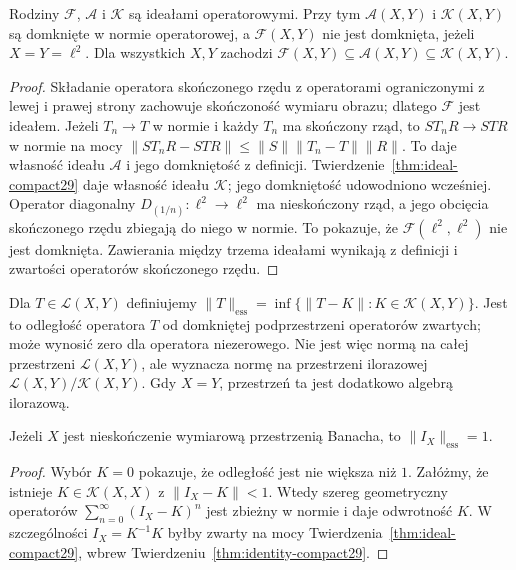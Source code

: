 \begin{twierdzenie}
\label{thm:ideals29}
Rodziny $\mathcal F$, $\mathcal A$ i $\mathcal K$ są
ideałami operatorowymi. Przy tym $\mathcal A(X,Y)$
i $\mathcal K(X,Y)$ są domknięte w normie operatorowej,
a $\mathcal F(X,Y)$ nie jest domknięta, jeżeli
$X=Y=\ell^2$. Dla wszystkich $X,Y$ zachodzi
$\mathcal F(X,Y)\subseteq\mathcal A(X,Y)\subseteq
\mathcal K(X,Y)$.
\end{twierdzenie}
\begin{proof}
Składanie operatora skończonego rzędu z operatorami
ograniczonymi z lewej i prawej strony zachowuje
skończoność wymiaru obrazu; dlatego $\mathcal F$ jest ideałem.
Jeżeli $T_n\to T$ w normie i każdy $T_n$ ma skończony
rząd, to $ST_nR\to STR$ w normie na mocy
$\|ST_nR-STR\|\le\|S\|\|T_n-T\|\|R\|$.
To daje własność ideału $\mathcal A$ i jego domkniętość
z definicji. Twierdzenie~\ref{thm:ideal-compact29}
daje własność ideału $\mathcal K$; jego domkniętość
udowodniono wcześniej. Operator diagonalny
$D_{(1/n)}:\ell^2\to\ell^2$ ma nieskończony rząd,
a jego obcięcia skończonego rzędu zbiegają do niego
w normie. To pokazuje, że $\mathcal F(\ell^2,\ell^2)$
nie jest domknięta. Zawierania między trzema ideałami
wynikają z definicji i zwartości operatorów
skończonego rzędu.
\end{proof}

\begin{definicja}
\label{def:essential-norm29}
Dla $T\in\mathcal L(X,Y)$ definiujemy
$\|T\|_{\mathrm{ess}}=
\inf\{\|T-K\|:K\in\mathcal K(X,Y)\}$.
Jest to odległość operatora $T$ od domkniętej
podprzestrzeni operatorów zwartych; może wynosić zero
dla operatora niezerowego. Nie jest więc normą
na całej przestrzeni $\mathcal L(X,Y)$, ale wyznacza normę
na przestrzeni ilorazowej
$\mathcal L(X,Y)/\mathcal K(X,Y)$. Gdy $X=Y$,
przestrzeń ta jest dodatkowo algebrą ilorazową.
\end{definicja}

\begin{twierdzenie}
\label{thm:essential-identity29}
Jeżeli $X$ jest nieskończenie wymiarową przestrzenią
Banacha, to $\|I_X\|_{\mathrm{ess}}=1$.
\end{twierdzenie}
\begin{proof}
Wybór $K=0$ pokazuje, że odległość jest nie większa
niż $1$. Załóżmy, że istnieje $K\in\mathcal K(X,X)$
z $\|I_X-K\|<1$. Wtedy szereg geometryczny operatorów
$\sum_{n=0}^{\infty}(I_X-K)^n$ jest zbieżny w normie
i daje odwrotność $K$. W szczególności
$I_X=K^{-1}K$ byłby zwarty na mocy
Twierdzenia~\ref{thm:ideal-compact29}, wbrew
Twierdzeniu~\ref{thm:identity-compact29}.
\end{proof}


